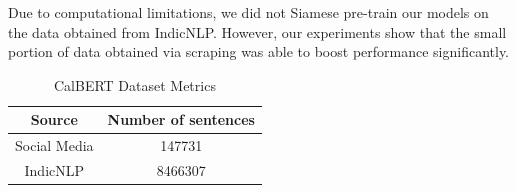 \documentclass[conference]{IEEEtran}
\begin{document}
Due to computational limitations, we did not Siamese pre-train our models on the data obtained from IndicNLP\cite{b16}. However, our experiments show that the small portion of data obtained via scraping was able to boost performance significantly.


\begin{table}[htbp]
    \centering
    \caption{CalBERT Dataset Metrics}
    \label{tab:calbert_dataset_metrics}
    \begin{tabular}{|c|c|}
        \hline
        \textbf{Source} & \textbf{Number of sentences}  \\
        \hline 
        Social Media & 147731 \\
        \hline 
        IndicNLP & 8466307 \\
        \hline
    \end{tabular}
\end{table}
\end{document}
